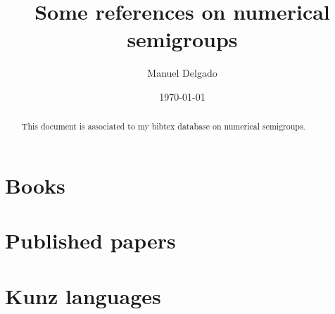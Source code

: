 \documentclass[11pt]{amsart}
\title{Some references on numerical semigroups}
\author{Manuel Delgado
\email{mdelgado@fc.up.pt}
}
\date{\today}
\theoremstyle{remark}
\begin{document}

\begin{abstract}
This document is associated to my bibtex database on numerical semigroups. 
\end{abstract}
\maketitle

\section{Books}\label{sec:books}

\section{Published papers}\label{sec:publshed-papers}

\section{Kunz languages}\label{sec:preprints}
 
\printbibliography
%
%
%
\end{document}
